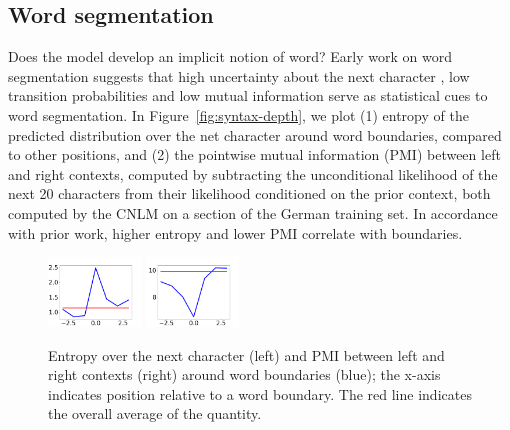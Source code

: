 \subsection{Word segmentation}
\label{sec:segmentation}



Does the model develop an implicit notion of word?
Early work on word segmentation suggests that high uncertainty about the next character \cite{cohen-algorithm-2001, feng-accessor-2004},  low transition probabilities \cite{harris-distributional-1954, saffran-word-1996} and low mutual information \cite{sun-chinese-1998} serve as statistical cues to word segmentation.
In Figure~\ref{fig:syntax-depth}, we plot (1) entropy of the predicted distribution over the net character around word boundaries, compared to other positions, and (2) the pointwise mutual information (PMI) between left and right contexts, computed by subtracting the unconditional likelihood of the next 20 characters from their likelihood conditioned on the prior context, both computed by the CNLM on a section of the German training set.
In accordance with prior work, higher entropy and lower PMI correlate with boundaries.


\begin{figure}
\includegraphics[width=0.22\textwidth]{figures/segmentation-profile-flattened-entropies-german.png}
\includegraphics[width=0.22\textwidth]{figures/segmentation-profile-flattened-pmis-german.png}
	\caption{Entropy over the next character (left) and PMI between left and right contexts (right) around word boundaries (blue); the x-axis indicates position relative to a word boundary. The red line indicates the overall average of the quantity. }\label{fig:boundaries-entropy}
\end{figure}


